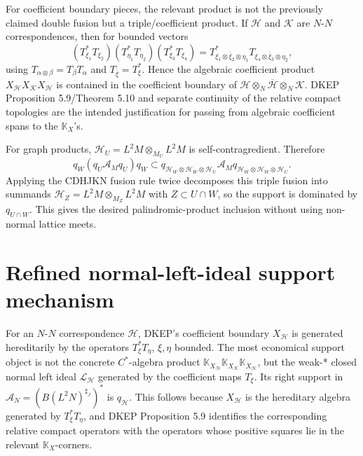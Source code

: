 \documentclass{article}
\begin{document}
For coefficient boundary pieces, the relevant product is not the previously
claimed double fusion but a triple/coefficient product.  If \(\mathcal H\) and
\(\mathcal K\) are \(N\)-\(N\) correspondences, then for bounded vectors
\[
(T_{\xi_1}^*T_{\xi_2})(T_{\eta_1}^*T_{\eta_2})(T_{\xi_3}^*T_{\xi_4})
 =
T_{\xi_1\otimes\bar\xi_2\otimes\eta_1}^*
T_{\xi_4\otimes\bar\xi_3\otimes\eta_2},
\]
using \(T_{\alpha\otimes\beta}=T_\beta T_\alpha\) and
\(T_{\bar\xi}=T_\xi^*\).  Hence the algebraic coefficient product
\(X_{\mathcal H}X_{\mathcal K}X_{\mathcal H}\) is contained in the coefficient
boundary of
\(\mathcal H\otimes_N\overline{\mathcal H}\otimes_N\mathcal K\).
DKEP Proposition 5.9/Theorem 5.10 and separate continuity of the relative
compact topologies are the intended justification for passing from algebraic
coefficient spans to the \(\mathbb K_X\)'s.

For graph products,
\(\mathcal H_U=L^2M\otimes_{M_U}L^2M\) is self-contragredient.  Therefore
\[
q_W(q_U\mathcal A_Mq_U)q_W
\subset
q_{\mathcal H_W\otimes\mathcal H_W\otimes\mathcal H_U}\mathcal A_M
q_{\mathcal H_W\otimes\mathcal H_W\otimes\mathcal H_U}.
\]
Applying the CDHJKN fusion rule twice decomposes this triple fusion into
summands \(\mathcal H_Z=L^2M\otimes_{M_Z}L^2M\) with \(Z\subset U\cap W\), so
the support is dominated by \(q_{U\cap W}\).  This gives the desired
palindromic-product inclusion without using non-normal lattice meets.


\section*{Refined normal-left-ideal support mechanism}

For an \(N\)-\(N\) correspondence \(\mathcal H\), DKEP's coefficient boundary
\(X_{\mathcal H}\) is generated hereditarily by the operators
\(T_\xi^*T_\eta\), \(\xi,\eta\) bounded.  The most economical support object is
not the concrete \(C^*\)-algebra product
\(\mathbb K_{X_{\mathcal H}}\mathbb K_{X_{\mathcal K}}
\mathbb K_{X_{\mathcal H}}\), but the weak-* closed normal left ideal
\(\mathcal L_{\mathcal H}\) generated by the coefficient maps \(T_\xi\).  Its
right support in \(\mathcal A_N=(B(L^2N)^{\sharp_J})^*\) is
\(q_{\mathcal H}\).  This follows because \(X_{\mathcal H}\) is the hereditary
algebra generated by \(T_\xi^*T_\eta\), and DKEP Proposition 5.9 identifies the
corresponding relative compact operators with the operators whose positive
squares lie in the relevant \(\mathbb K_X\)-corners.
\end{document}
